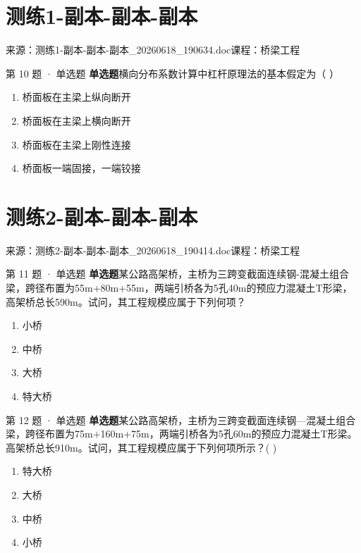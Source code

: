 \documentclass[UTF8,zihao=-4,openany]{ctexbook}
\newenvironment{choices}{\begin{enumerate}[label=\Alph*.,leftmargin=9mm,labelsep=3mm,itemsep=2pt,topsep=4pt]}{\end{enumerate}}
\newcommand{\qtype}[1]{\textcolor{brand}{\sffamily\bfseries #1}}
\newcommand{\sourcefile}[1]{\textcolor{muted}{\small\sffamily 来源：#1}}
\begin{document}
\chapter{测练1-副本-副本-副本}

\sourcefile{测练1-副本-副本-副本\_20260618\_190634.doc}\quad \textcolor{muted}{\small\sffamily 课程：桥梁工程}

\begin{questionbox}{第 10 题 · 单选题}
\qtype{单选题}\quad 横向分布系数计算中杠杆原理法的基本假定为（ ）
\begin{choices}
\item 桥面板在主梁上纵向断开
\item 桥面板在主梁上横向断开
\item 桥面板在主梁上刚性连接
\item 桥面板一端固接，一端铰接
\end{choices}
\end{questionbox}

\chapter{测练2-副本-副本-副本}

\sourcefile{测练2-副本-副本-副本\_20260618\_190414.doc}\quad \textcolor{muted}{\small\sffamily 课程：桥梁工程}

\begin{questionbox}{第 11 题 · 单选题}
\qtype{单选题}\quad 某公路高架桥，主桥为三跨变截面连续钢-混凝土组合梁，跨径布置为55m+80m+55m，两端引桥各为5孔40m的预应力混凝土T形梁，高架桥总长590m。试问，其工程规模应属于下列何项？
\begin{choices}
\item 小桥
\item 中桥
\item 大桥
\item 特大桥
\end{choices}
\end{questionbox}

\begin{questionbox}{第 12 题 · 单选题}
\qtype{单选题}\quad 某公路高架桥，主桥为三跨变截面连续钢—混凝土组合梁，跨径布置为75m+160m+75m，两端引桥各为5孔60m的预应力混凝土T形梁。高架桥总长910m。试问，其工程规模应属于下列何项所示？( )
\begin{choices}
\item 特大桥
\item 大桥
\item 中桥
\item 小桥
\end{choices}
\end{questionbox}
\end{document}
